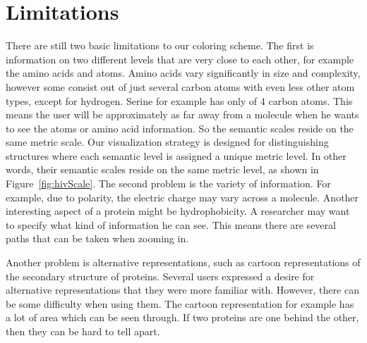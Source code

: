 \documentclass[review,journal]{vgtc}         %
\begin{document}
	
	\section{Limitations}
	There are still two basic limitations to our coloring scheme. 
	The first is information on two different levels that are very close to each other, for example the amino acids and atoms. 
	Amino acids vary significantly in size and complexity, however some consist out of just several carbon atoms with even less other atom types, except for hydrogen. 
	Serine for example has only of 4 carbon atoms. This means the user will be approximately as far away from a molecule when he wants to see the atoms or amino acid information. 
	So the semantic scales reside on the same metric scale.
	Our visualization strategy is designed for distinguishing structures where each semantic level is assigned a unique metric level.
	In other words, their semantic scales reside on the same metric level, as shown in Figure~\ref{fig:hivScale}.
	The second problem is the variety of information. 
	For example, due to polarity, the electric charge may vary across a molecule. 
	Another interesting aspect of a protein might be hydrophobicity.
	A researcher may want to specify what kind of information he can see. 
	This means there are several paths that can be taken when zooming in.
	
	Another problem is alternative representations, such as cartoon representations of the secondary structure of proteins. 
	Several users expressed a desire for alternative representations that they were more familiar with.
	However, there can be some difficulty when using them. The cartoon representation for example has a lot of area which can be seen through. 
	If two proteins are one behind the other, then they can be hard to tell apart.
	
\end{document}
